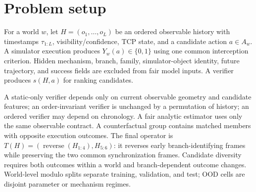 \section{Problem setup}
For a world $w$, let $H=(o_1,\ldots,o_L)$ be an ordered observable history with timestamps $\tau_{1:L}$, visibility/confidence, TCP state, and a candidate action $a\in A_w$. A simulator execution produces $Y_w(a)\in\{0,1\}$ using one common interception criterion. Hidden mechanism, branch, family, simulator-object identity, future trajectory, and success fields are excluded from fair model inputs. A verifier produces $s(H,a)$ for ranking candidates.

A static-only verifier depends only on current observable geometry and candidate features; an order-invariant verifier is unchanged by a permutation of history; an ordered verifier may depend on chronology. A fair analytic estimator uses only the same observable contract. A counterfactual group contains matched members with opposite execution outcomes. The final operator is $T(H)=(\operatorname{reverse}(H_{1:4}),H_{5:6})$: it reverses early branch-identifying frames while preserving the two common synchronization frames. Candidate diversity requires both outcomes within a world and branch-dependent outcome changes. World-level modulo splits separate training, validation, and test; OOD cells are disjoint parameter or mechanism regimes.
